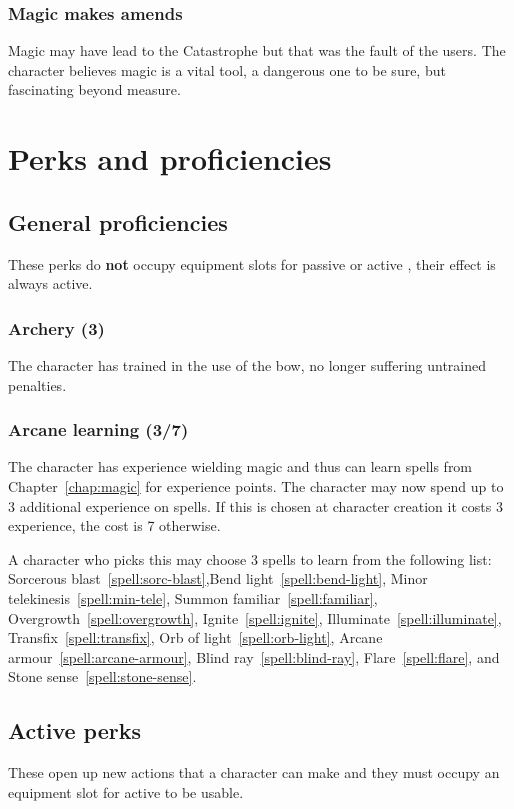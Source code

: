 \documentclass[a4paper,11pt,oneside]{book}
\newcommand{\textlf}[1]{\textbf{\titlecap{#1}}}
\begin{document}
\subsection{Magic makes amends}
Magic may have lead to the Catastrophe but that was the fault of the users. The character believes magic is a vital tool, a dangerous one to be sure, but fascinating beyond measure. 


\chapter{Perks and proficiencies}

\section{General proficiencies}
These perks do \textbf{not} occupy equipment slots for passive or active \textlf{perk}, their effect is always active.

\subsection{Archery (3)}
The character has trained in the use of the bow, no longer suffering untrained penalties.

\subsection{Arcane learning (3/7)}
The character has experience wielding magic and thus can learn spells from Chapter~\ref{chap:magic} for experience points. The character may now spend up to 3 additional experience on spells. If this is chosen at character creation it costs 3 experience, the cost is 7 otherwise. 

A character who picks this may choose 3 spells to learn from the following list: Sorcerous blast~\ref{spell:sorc-blast},Bend light~\ref{spell:bend-light}, Minor telekinesis~\ref{spell:min-tele}, Summon familiar~\ref{spell:familiar}, Overgrowth~\ref{spell:overgrowth}, Ignite~\ref{spell:ignite}, Illuminate~\ref{spell:illuminate}, Transfix~\ref{spell:transfix}, Orb of light~\ref{spell:orb-light}, Arcane armour~\ref{spell:arcane-armour}, Blind ray~\ref{spell:blind-ray}, Flare~\ref{spell:flare}, and Stone sense~\ref{spell:stone-sense}.

\section{Active perks}
These open up new actions that a character can make and they must occupy an equipment slot for active \textlf{perks} to be usable.
\end{document}
